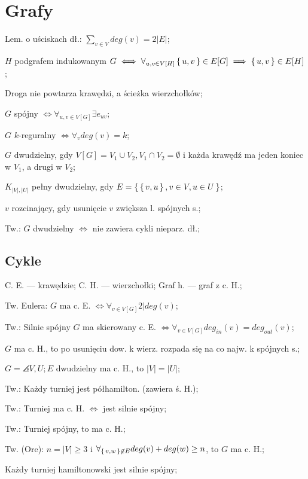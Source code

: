 \section{Grafy}

\entry
Lem. o uściskach dł.: $\sum_{v\in V} deg(v) = 2|E|$;

\entry
$H$ podgrafem indukowanym $G
  \iff \forall_{u,v \in V[H]} \set{u, v} \in E[G] \implies \set{u, v}\in E[H]$;

\entry
Droga nie powtarza krawędzi, a ścieżka wierzchołków;

\entry
$G$ spójny $\iff \forall_{u,v\in V[G]} \exists e_{uv}$;

\entry
$G$ $k$-reguralny $\iff \forall_v deg(v) = k$;

\entry
$G$ dwudzielny, gdy $V[G] = V_1 \cup V_2, V_1 \cap V_2 = \emptyset$ i każda
  krawędź ma jeden koniec w $V_1$, a drugi w $V_2$;

\entry
$K_{|V|, |U|}$ pełny dwudzielny, gdy $E=\set{\set{v, u}, v \in V, u \in U}$;

\entry
$v$ rozcinający, gdy usunięcie $v$ zwiększa l. spójnych s.;

\entry
Tw.: $G$ dwudzielny $\iff$ nie zawiera cykli nieparz. dł.;

\subsection{Cykle}

\entry
C. E. --- krawędzie; C. H. --- wierzchołki; Graf h. --- graf z c. H.;

\entry
Tw. Eulera: $G$ ma c. E. $\iff \forall_{v \in V[G]} 2|deg(v)$;

\entry
Tw.: Silnie spójny $G$ ma skierowany c. E.
  $\iff \forall_{v \in V[G]} deg_{in}(v) = deg_{out}(v)$;

\entry
$G$ ma c. H., to po usunięciu dow. k wierz. rozpada się na co najw.
  k spójnych s.;

\entry
$G = \angles{V, U; E}$ dwudzielny ma c. H., to $|V|=|U|$;

\entry
Tw.: Każdy turniej jest półhamilton. (zawiera ś. H.);

\entry
Tw.: Turniej ma c. H. $\iff$ jest silnie spójny;

\entry
Tw.: Turniej spójny, to ma c. H.;

\entry
Tw. (Ore): $n=|V|\geq 3$ i
  $\forall_{\set{v, w} \not\in E} deg(v) + deg(w) \geq n$, to $G$ ma c. H.;

\entry
Każdy turniej hamiltonowski jest silnie spójny;

